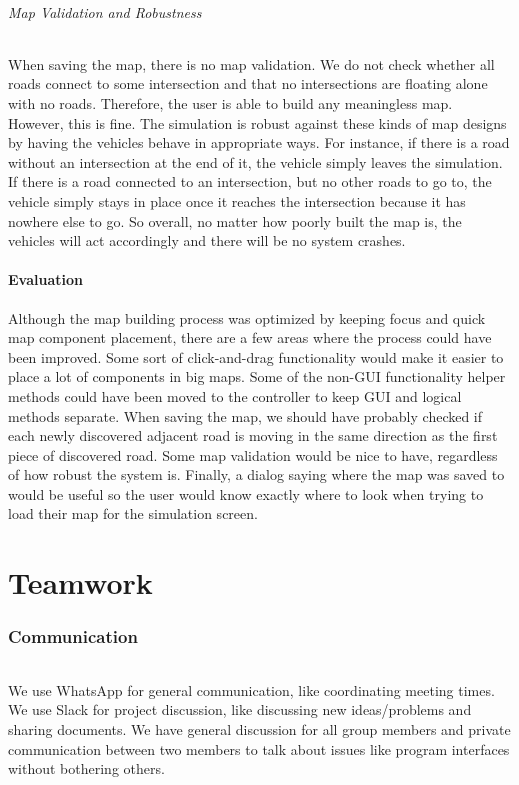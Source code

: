 \documentclass[a4paper,11pt,titlepage]{article}
\begin{document}
\paragraph{Map Validation and Robustness}
When saving the map, there is no map validation. We do not check whether all roads connect to some intersection and that no intersections are floating alone with no roads. Therefore, the user is able to build any meaningless map. However, this is fine. The simulation is robust against these kinds of map designs by having the vehicles behave in appropriate ways. For instance, if there is a road without an intersection at the end of it, the vehicle simply leaves the simulation. If there is a road connected to an intersection, but no other roads to go to, the vehicle simply stays in place once it reaches the intersection because it has nowhere else to go. So overall, no matter how poorly built the map is, the vehicles will act accordingly and there will be no system crashes.

\subsection{Evaluation}
Although the map building process was optimized by keeping focus and quick map component placement, there are a few areas where the process could have been improved. Some sort of click-and-drag functionality would make it easier to place a lot of components in big maps. Some of the non-GUI functionality helper methods could have been moved to the controller to keep GUI and logical methods separate. When saving the map, we should have probably checked if each newly discovered adjacent road is moving in the same direction as the first piece of discovered road. Some map validation would be nice to have, regardless of how robust the system is. Finally, a dialog saying where the map was saved to would be useful so the user would know exactly where to look when trying to load their map for the simulation screen.

\part{Teamwork}
\section{Communication}
\paragraph{}
We use WhatsApp for general communication, like coordinating meeting times. We use Slack for project discussion, like discussing new ideas/problems and sharing documents. We have general discussion for all group members and private communication between two members to talk about issues like program interfaces without bothering others.
\end{document}
